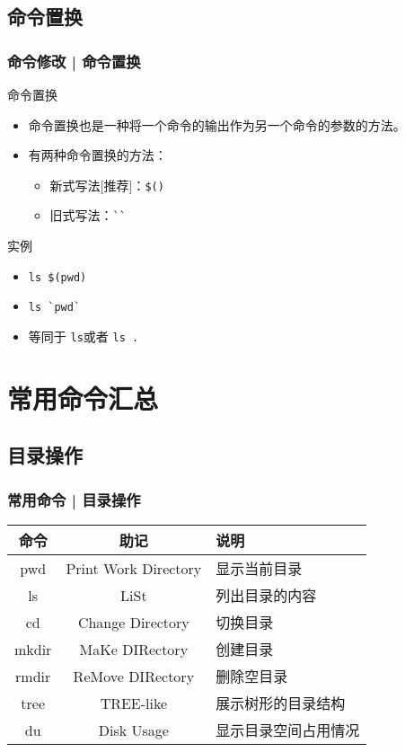 \subsection{命令置换}
\begin{frame}[fragile]
  \frametitle{命令修改 | \alert{命令置换}}
  \begin{block}{命令置换}
    \begin{itemize}
      \item 命令置换也是一种将一个命令的输出作为另一个命令的参数的方法。
      \item 有两种命令置换的方法：
	\begin{itemize}
	  \item 新式写法[推荐]：\verb|$()|
	  \item 旧式写法：\verb|``|
	\end{itemize}
    \end{itemize}
  \end{block}
  \pause
  \begin{block}{实例}
    \begin{itemize}[<+->]
      \item \verb|ls $(pwd)|
      \item \verb|ls `pwd`|
      \item 等同于 \verb|ls|或者 \verb|ls .|
    \end{itemize}
  \end{block}
\end{frame}

\section{常用命令汇总}
\subsection{目录操作}
\begin{frame}
  \frametitle{常用命令 | \alert{目录操作}}
  \begin{table}
    \centering
    \begin{tabular}{ccl}
      \hline
      \rowcolor{blue!50}命令 & 助记 & 说明\\
      \hline
      pwd & Print Work Directory & 显示当前目录\\
      ls & LiSt & 列出目录的内容\\
      cd & Change Directory & 切换目录\\
      mkdir & MaKe DIRectory & 创建目录\\
      rmdir & ReMove DIRectory & 删除空目录\\
      tree & TREE-like & 展示树形的目录结构\\
      du & Disk Usage & 显示目录空间占用情况\\
      \hline
    \end{tabular}
  \end{table}
\end{frame}

